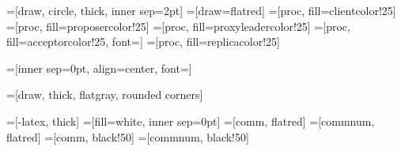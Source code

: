 =[draw, circle, thick, inner sep=2pt]
=[draw=flatred]
=[proc, fill=clientcolor!25]
=[proc, fill=proposercolor!25]
=[proc, fill=proxyleadercolor!25]
=[proc, fill=acceptorcolor!25, font=\scriptsize]
=[proc, fill=replicacolor!25]

=[inner sep=0pt, align=center, font=\footnotesize]

=[draw, thick, flatgray, rounded corners]

=[-latex, thick]
=[fill=white, inner sep=0pt]
=[comm, flatred]
=[commnum, flatred]
=[comm, black!50]
=[commnum, black!50]

